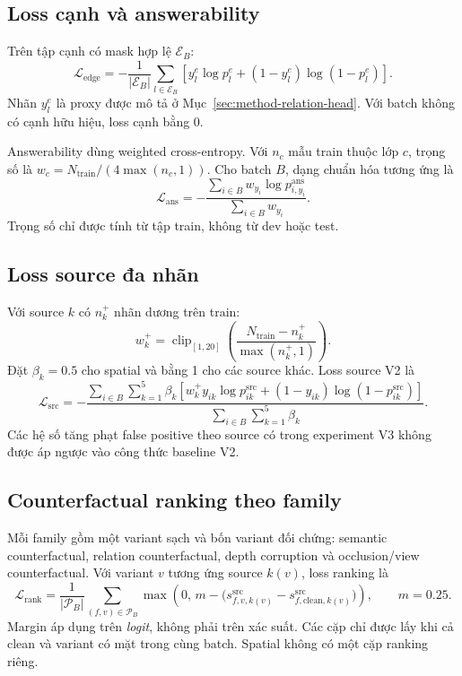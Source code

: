 \subsection{Loss cạnh và answerability}

Trên tập cạnh có mask hợp lệ $\mathcal{E}_B$:
\begin{equation}
    \mathcal{L}_{\mathrm{edge}}=
    -\frac{1}{|\mathcal{E}_B|}
    \sum_{l\in\mathcal{E}_B}
    \left[y_l^{e}\log p_l^{e}
    +(1-y_l^{e})\log(1-p_l^{e})\right].
\end{equation}
Nhãn $y_l^e$ là proxy được mô tả ở
Mục~\ref{sec:method-relation-head}. Với batch không có cạnh
hữu hiệu, loss cạnh bằng 0.

Answerability dùng weighted cross-entropy. Với $n_c$ mẫu
train thuộc lớp $c$, trọng số là
$w_c=N_{\mathrm{train}}/(4\max(n_c,1))$.
Cho batch $B$, dạng chuẩn hóa tương ứng là
\begin{equation}
    \mathcal{L}_{\mathrm{ans}}=
    -\frac{\sum_{i\in B}w_{y_i}\log p_{i,y_i}^{\mathrm{ans}}}
    {\sum_{i\in B}w_{y_i}}.
\end{equation}
Trọng số chỉ được tính từ tập train, không từ dev hoặc test.

\subsection{Loss source đa nhãn}

Với source $k$ có $n_k^+$ nhãn dương trên train:
\begin{equation}
    w_k^+=\operatorname{clip}_{[1,20]}
    \left(\frac{N_{\mathrm{train}}-n_k^+}
    {\max(n_k^+,1)}\right).
\end{equation}
Đặt $\beta_k=0.5$ cho spatial và bằng 1 cho các source khác.
Loss source V2 là
\begin{equation}
    \mathcal{L}_{\mathrm{src}}=
    -\frac{
    \sum_{i\in B}\sum_{k=1}^{5}\beta_k
    \left[w_k^+y_{ik}\log p_{ik}^{\mathrm{src}}
    +(1-y_{ik})\log(1-p_{ik}^{\mathrm{src}})\right]}
    {\sum_{i\in B}\sum_{k=1}^{5}\beta_k}.
\end{equation}
Các hệ số tăng phạt false positive theo source có trong
experiment V3 không được áp ngược vào công thức baseline V2.

\subsection{Counterfactual ranking theo family}

Mỗi family gồm một variant sạch và bốn variant đối chứng:
semantic counterfactual, relation counterfactual, depth
corruption và occlusion/view counterfactual.
Với variant $v$ tương ứng source $k(v)$, loss ranking là
\begin{equation}
    \mathcal{L}_{\mathrm{rank}}=
    \frac{1}{|\mathcal{P}_B|}
    \sum_{(f,v)\in\mathcal{P}_B}
    \max\left(0,\,
    m-\bigl(s_{f,v,k(v)}^{\mathrm{src}}
    -s_{f,\mathrm{clean},k(v)}^{\mathrm{src}}\bigr)\right),
    \qquad m=0.25.
\end{equation}
Margin áp dụng trên \emph{logit}, không phải trên xác suất.
Các cặp chỉ được lấy khi cả clean và variant có mặt trong
cùng batch. Spatial không có một cặp ranking riêng.

